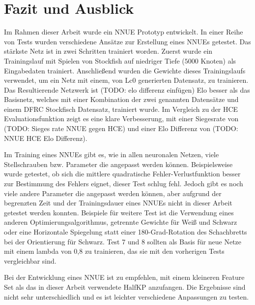 \chapter{Fazit und Ausblick}

Im Rahmen dieser Arbeit wurde ein \ac{NNUE} Prototyp entwickelt. In einer Reihe von Tests wurden verschiedene Ansätze zur Erstellung eines \acp{NNUE} getestet. Das stärkste Netz ist in zwei Schritten trainiert worden. Zuerst wurde ein Trainingslauf mit Spielen von Stockfish auf niedriger Tiefe ($5000$ Knoten) als Eingabedaten trainiert. Anschließend wurden die Gewichte dieses Trainingslaufs verwendet, um ein Netz mit einem, von \ac{Lc0} generierten Datensatz, zu trainieren. Das Resultierende Netzwerk ist (TODO: elo differenz einfügen) Elo besser als das Basisnetz, welches mit einer Kombination der zwei genannten Datensätze und einem \ac{DFRC} Stockfisch Datensatz, trainiert wurde. Im Vergleich zu der \ac{HCE} Evaluationsfunktion zeigt es eine klare Verbesserung, mit einer Siegesrate von (TODO: Sieges rate NNUE gegen HCE) und einer Elo Differenz von (TODO: NNUE HCE Elo Differenz). 

Im Training eines \acp{NNUE} gibt es, wie in allen neuronalen Netzen, viele Stellschrauben bzw. Parameter die angepasst werden können. Beispielsweise wurde getestet, ob sich die mittlere quadratische Fehler-Verlustfunktion besser zur Bestimmung des Fehlers eignet, dieser Test schlug fehl. Jedoch gibt es noch viele andere Parameter die angepasst werden können, aber aufgrund der begrenzten Zeit und der Trainingsdauer eines \acp{NNUE} nicht in dieser Arbeit getestet werden konnten. Beispiele für weitere Test ist \zb{} die Verwendung eines anderen Optimierungsalgorithmus, getrennte Gewichte für Weiß und Schwarz oder eine Horizontale Spiegelung statt einer 180-Grad-Rotation des Schachbretts bei der Orientierung für Schwarz. Test 7 und 8 sollten als Basis für neue Netze mit einem lambda von 0,8 zu trainieren, das sie mit den vorherigen Tests vergleichbar sind.

Bei der Entwicklung eines \ac{NNUE} ist zu empfehlen, mit einem kleineren Feature Set als das in dieser Arbeit verwendete HalfKP anzufangen. Die Ergebnisse sind nicht sehr unterschiedlich und es ist leichter verschiedene Anpassungen zu testen.

